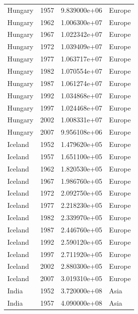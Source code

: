 \documentclass[
  letterpaper,
  DIV=11,
  numbers=noendperiod]{scrreprt}
\begin{document}
\begin{tcolorbox}
\begin{tabular}{lrrl}
Hungary                  &  1957 &  9.839000e+06 &    Europe \\
Hungary                  &  1962 &  1.006300e+07 &    Europe \\
Hungary                  &  1967 &  1.022342e+07 &    Europe \\
Hungary                  &  1972 &  1.039409e+07 &    Europe \\
Hungary                  &  1977 &  1.063717e+07 &    Europe \\
Hungary                  &  1982 &  1.070554e+07 &    Europe \\
Hungary                  &  1987 &  1.061274e+07 &    Europe \\
Hungary                  &  1992 &  1.034868e+07 &    Europe \\
Hungary                  &  1997 &  1.024468e+07 &    Europe \\
Hungary                  &  2002 &  1.008331e+07 &    Europe \\
Hungary                  &  2007 &  9.956108e+06 &    Europe \\
Iceland                  &  1952 &  1.479620e+05 &    Europe \\
Iceland                  &  1957 &  1.651100e+05 &    Europe \\
Iceland                  &  1962 &  1.820530e+05 &    Europe \\
Iceland                  &  1967 &  1.986760e+05 &    Europe \\
Iceland                  &  1972 &  2.092750e+05 &    Europe \\
Iceland                  &  1977 &  2.218230e+05 &    Europe \\
Iceland                  &  1982 &  2.339970e+05 &    Europe \\
Iceland                  &  1987 &  2.446760e+05 &    Europe \\
Iceland                  &  1992 &  2.590120e+05 &    Europe \\
Iceland                  &  1997 &  2.711920e+05 &    Europe \\
Iceland                  &  2002 &  2.880300e+05 &    Europe \\
Iceland                  &  2007 &  3.019310e+05 &    Europe \\
India                    &  1952 &  3.720000e+08 &      Asia \\
India                    &  1957 &  4.090000e+08 &      Asia \\

\end{tabular}
\end{tcolorbox}
\end{document}
